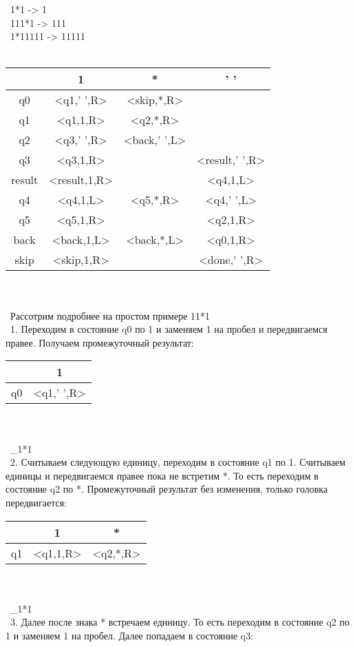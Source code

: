 \documentclass[a4paper]{article}
\begin{document}
\begin{enumerate}
\ 1*1 -> 1\\
\ 111*1 -> 111\\
\ 1*11111 -> 11111\\
\\
\begin{tabular}{|*{4}{c|}}
\textbf{ } & 1 & * & ' '\\
\hline\hline
q0 & <q1,' ',R> & <skip,*,R> & \\
\hline\hline
q1 & <q1,1,R> & <q2,*,R> & \\
\hline\hline
q2 & <q3,' ',R> & <back,' ',L> &\\
\hline\hline
q3 & <q3,1,R> & &<result,' ',R>\\
\hline\hline
result & <result,1,R> & &<q4,1,L>\\
\hline\hline
q4 & <q4,1,L>& <q5,*,R> &<q4,' ',L> \\
\hline\hline
q5 & <q5,1,R>& &<q2,1,R> \\
\hline\hline
back & <back,1,L>& <back,*,L> &<q0,1,R> \\
\hline\hline
skip & <skip,1,R>& &<done,' ',R> \\
\end{tabular}
\\
\\
\ Рассотрим подробнее на простом примере 11*1\\
\ 1. Переходим в состояние q0 по 1 и заменяем 1 на пробел и передвигаемся правее. Получаем промежуточный результат: \\
\begin{tabular}{|*{2}{c|}}
\textbf{ } & 1 \\
\hline\hline
q0 & <q1,' ',R> \\
\end{tabular}
\\ \\
\ \_1*1 \\
\ 2. Считываем следующую единицу, переходим в состояние q1 по 1. Считываем единицы и передвигаемся правее пока не встретим *. То есть переходим в состояние q2 по *. Промежуточный результат без изменения, только головка передвигается: \\
\begin{tabular}{|*{3}{c|}}
\textbf{ } & 1 &*\\
\hline\hline
q1 & <q1,1,R> & <q2,*,R> \\
\end{tabular}
\\ \\
\ \_1*1 \\
\ 3. Далее после знака * встречаем единицу. То есть переходим в состояние q2 по 1 и заменяем 1 на пробел. Далее попадаем в состояние q3: \\

\end{enumerate}
\end{document}
